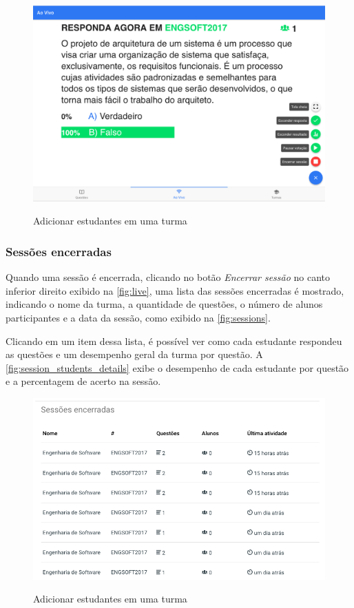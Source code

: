 \begin{figure}[h]
  \centering
  \caption{Adicionar estudantes em uma turma}
  \includegraphics[scale=.4]{imagens/telas/live_answers}
  \doautor
  \label{fig:live_answers}
\end{figure}

\subsubsection{Sessões encerradas}

Quando uma sessão é encerrada, clicando no botão \textit{Encerrar sessão} no canto inferior direito
exibido na \autoref{fig:live}, uma lista das sessões encerradas é mostrado, indicando
o nome da turma, a quantidade de questões, o número de alunos participantes e a data da sessão, como
exibido na \autoref{fig:sessions}.

Clicando em um item dessa lista, é possível ver como cada estudante respondeu as questões e um
desempenho geral da turma por questão. A \autoref{fig:session_students_details}  exibe o
desempenho de cada estudante por questão e a percentagem de acerto na sessão.

\begin{figure}[h]
  \centering
  \caption{Adicionar estudantes em uma turma}
  \includegraphics[scale=.4]{imagens/telas/sessions}
  \doautor
  \label{fig:sessions}
\end{figure}

